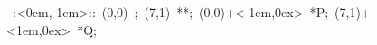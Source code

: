 

\hbox{
\xy    <1cm,0cm>:<0cm,-1cm>::
       (0,0) ; (7,1) **\dir{-}; 
       (0,0)+<-1em,0ex> *{P};
       (7,1)+<1em,0ex> *{Q};  
\endxy}
	   
